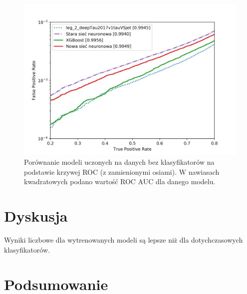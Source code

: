 \documentclass{pracalicmgr}
\begin{document}
	\begin{figure}
	\centering
	\includegraphics[width=1\textwidth]{without_disc.png}
	\caption{Porównanie modeli uczonych na danych bez klasyfikatorów na podstawie krzywej ROC (z zamienionymi osiami). W nawiasach kwadratowych podano wartość ROC AUC dla danego modelu.}
	\label{fig:res_disc}
	\end{figure}
	
	
    
    \chapter{Dyskusja}
	Wyniki liczbowe dla wytrenowanych modeli są lepsze niż dla dotychczasowych klasyfikatorów. 
    
    \chapter{Podsumowanie}
    
    \printbibliography
    
\end{document}
